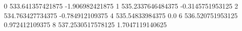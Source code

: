 0 533.641357421875 -1.906982421875
1 535.2337646484375 -0.3145751953125
2 534.763427734375 -0.784912109375
4 535.54833984375 0.0
6 536.520751953125 0.972412109375
8 537.2530517578125 1.7047119140625
